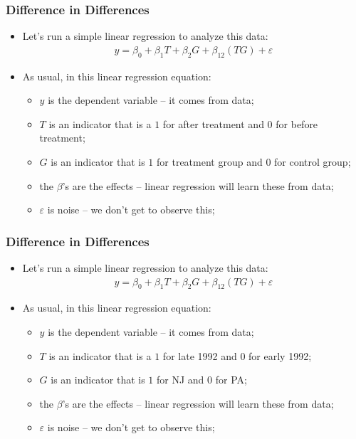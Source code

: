 \documentclass[aspectratio=169]{beamer}
\theoremstyle{principle}
\begin{document}
\begin{frame}
\frametitle{Difference in Differences}

\begin{itemize}
\item Let's run a simple linear regression to analyze this data:\huge
\begin{align*}
y = \beta_0 + \beta_1T + \beta_2G + \beta_{12}(TG) + \varepsilon
\end{align*}
\bigskip

\normalsize
\item As usual, in this linear regression equation:
\begin{itemize}
\item $y$ is the dependent variable -- it comes from data;
\item $T$ is an indicator that is a $1$ for after treatment and $0$ for before treatment;
\item $G$ is an indicator that is $1$ for treatment group and $0$ for control group;
\item the $\beta$'s are the effects -- linear regression will learn these from data;
\item $\varepsilon$ is noise -- we don't get to observe this;
\end{itemize}

\end{itemize}

\end{frame}

\begin{frame}
\frametitle{Difference in Differences}

\begin{itemize}
\item Let's run a simple linear regression to analyze this data:\huge
\begin{align*}
y = \beta_0 + \beta_1T + \beta_2G + \beta_{12}(TG) + \varepsilon
\end{align*}
\bigskip

\normalsize
\item As usual, in this linear regression equation:
\begin{itemize}
\item $y$ is the dependent variable -- it comes from data;
\item $T$ is an indicator that is a $1$ for late 1992 and $0$ for early 1992;
\item $G$ is an indicator that is $1$ for NJ and $0$ for PA;
\item the $\beta$'s are the effects -- linear regression will learn these from data;
\item $\varepsilon$ is noise -- we don't get to observe this;
\end{itemize}

\end{itemize}

\end{frame}
\end{document}
